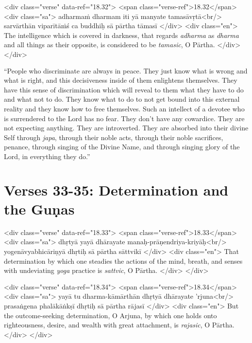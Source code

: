 \begin{html}
<div class="verse" data-ref="18.32">
  <span class="verse-ref">18.32</span>
  <div class="sa">
    adharmaṁ dharmam iti yā manyate tamasāvṛtā<br/>
    sarvārthān viparītāṁś ca buddhiḥ sā pārtha tāmasī
  </div>
  <div class="en">
    The intelligence which is covered in darkness, that regards \textit{adharma} as \textit{dharma} and all things as their opposite, is considered to be \textit{tamasic}, O Pārtha.
  </div>
</div>
\end{html}


\enquote{People who discriminate are always in peace. They just know what is wrong and what is right, and this decisiveness inside of them enlightens themselves. They have this sense of discrimination which will reveal to them what they have to do and what not to do. They know what to do to not get bound into this external reality and they know how to free themselves. Such an intellect of a devotee who is surrendered to the Lord has no fear. They don’t have any cowardice. They are not expecting anything. They are introverted. They are absorbed into their divine Self through \textit{japa}, through their noble acts, through their noble sacrifices, penance, through singing of the Divine Name, and through singing glory of the Lord, in everything they do.}

\section{Verses 33-35: Determination and the Guṇas}\label{sec-verses-33-35-determination-and-the-gunas}


\begin{html}
<div class="verse" data-ref="18.33">
  <span class="verse-ref">18.33</span>
  <div class="sa">
    dhṛtyā yayā dhārayate manaḥ-prāṇendriya-kriyāḥ<br/>
    yogenāvyabhicāriṇyā dhṛtiḥ sā pārtha sāttvikī
  </div>
  <div class="en">
    That determination by which one steadies the actions of the mind, breath, and senses with undeviating \textit{yoga} practice is \textit{sattvic}, O Pārtha.
  </div>
</div>
\end{html}




\begin{html}
<div class="verse" data-ref="18.34">
  <span class="verse-ref">18.34</span>
  <div class="sa">
    yayā tu dharma-kāmārthān dhṛtyā dhārayate ’rjuna<br/>
    prasaṅgena phalākāṅkṣī dhṛtiḥ sā pārtha rājasī
  </div>
  <div class="en">
    But the outcome-seeking determination, O Arjuna, by which one holds onto righteousness, desire, and wealth with great attachment, is \textit{rajasic}, O Pārtha.
  </div>
</div>
\end{html}



